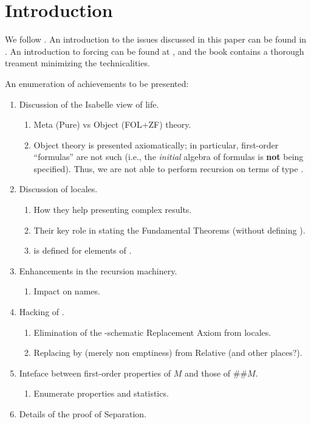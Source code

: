 \section{Introduction}
We follow \cite{kunen2011set}. An introduction to the issues discussed
in this paper can be found in \cite{2018arXiv180705174G}. An
introduction to forcing can be found at \cite{chow-beginner-forcing},
and the book \cite{weaver2014forcing} contains a thorough treament
minimizing the technicalities.

An enumeration of achievements to be presented:
\begin{enumerate}
\item Discussion of the Isabelle view of life.
  \begin{enumerate}
  \item Meta (Pure) vs Object (FOL+ZF) theory.
  \item Object theory is presented axiomatically; in particular,
    first-order ``formulas'' are not such (i.e., the \emph{initial}
    algebra of formulas is \textbf{not} being specified). Thus, we are
    not able to perform recursion on terms of type \tyo.
  \end{enumerate}
\item Discussion of locales.
  \begin{enumerate}
  \item How they help presenting complex results.
  \item Their key role in stating the Fundamental Theorems (without
    defining ).
  \item {} is defined for elements of \formula.
  \end{enumerate}
\item Enhancements in the recursion machinery.
  \begin{enumerate}
  \item Impact on names.
  \end{enumerate}
\item Hacking of .
  \begin{enumerate}
  \item Elimination of the \tyo-schematic Replacement Axiom from
    locales.
  \item Replacing  by  (merely non
    emptiness) from Relative (and other places?).
  \end{enumerate}
\item Inteface between first-order properties of $M$ and those of
  $\#\#M$.
  \begin{enumerate}
  \item Enumerate properties and statistics.
  \end{enumerate}
\item Details of the proof of Separation.
\end{enumerate}

